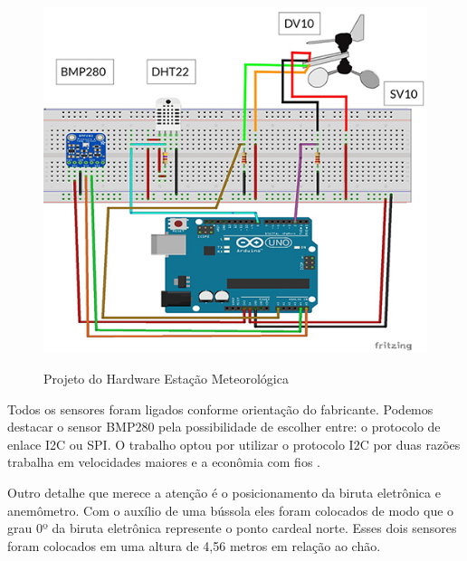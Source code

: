 \begin{figure} [!ht]
    \centering
    \caption{Projeto do Hardware Estação Meteorológica}
    \includegraphics [scale=0.45]{Figuras/estacao_proj_hard.jpg}
    \label{fig:hardestacao}
\end{figure}

Todos os sensores foram ligados conforme orientação do fabricante. Podemos destacar o sensor BMP280 pela possibilidade de escolher entre: o protocolo de enlace I2C ou SPI. O trabalho optou por utilizar o protocolo I2C por duas razões trabalha em velocidades maiores e a econômia com fios \cite{cinel2017desenvolvimento}. 

Outro detalhe que merece a atenção é o posicionamento da biruta eletrônica e anemômetro. Com o auxílio de uma bússola eles foram colocados de modo que o grau 0º da biruta eletrônica represente o ponto cardeal norte. Esses dois sensores foram colocados em uma altura de 4,56 metros em relação ao chão.

